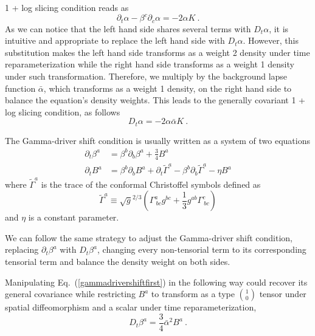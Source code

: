 1 + log slicing condition reads as
\begin{equation}\label{1 + log slicing}
\partial_{t}\alpha - \beta^{c}\partial_{c}\alpha = -2\alpha K \ .
\end{equation}
As we can notice that the left hand side shares several terms with $D_{t}\alpha$, it is intuitive and appropriate to replace the left hand side with $D_{t}\alpha$. However, this substitution makes the left hand side transforms as a weight 2 density under time reparameterization while the right hand side transforms as a weight 1 density under such transformation. Therefore, we multiply by the background lapse function ${\bar \alpha}$, which transforms as a weight 1 density, on the right hand side to balance the equation's density weights. This leads to the generally covariant 1 + log slicing condition, as follows
\begin{equation}\label{covariant 1 + log slicing}
D_{t}\alpha = -2\alpha{\bar \alpha}K \ .
\end{equation}

The Gamma-driver shift condition is usually written as a system of two equations
\begin{subequations}\label{gammadrivershiftset}
\begin{align}
\partial_{t}\beta^{a} & = \beta^{b}\partial_{b}\beta^{a} + \frac{3}{4}B^{a}\label{gammadrivershiftfirst}\\
\partial_{t}B^{a} & = \beta^{b}\partial_{b}B^{a} + \partial_{t}{\tilde \Gamma}^{a} - \beta^{b}\partial_{b}{\tilde \Gamma}^{a} - \eta B^{a}\label{gammadrivershiftsecond}
\end{align}
\end{subequations}
where ${\tilde \Gamma}^{a}$ is the trace of the conformal Christoffel symbols defined as
\begin{equation}
{\tilde \Gamma}^{a} \equiv \sqrt{g}^{2/3}\left(\Gamma^{a}_{~bc}g^{bc} + \frac{1}{3}g^{ab}\Gamma^{c}_{~bc}\right)
\end{equation}
and $\eta$ is a constant parameter. 

We can follow the same strategy to adjust the Gamma-driver shift condition, replacing $\partial_{t}\beta^{a}$ with $D_{t}\beta^{a}$, changing every non-tensorial term to its corresponding tensorial term and balance the density weight on both sides. 

Manipulating Eq.~(\ref{gammadrivershiftfirst}) in the following way could recover its general covariance while restricting $B^{a}$ to transform as a type $1 \choose 0$ tensor under spatial diffeomorphism and a scalar under time reparameterization, 
\begin{equation}\label{gammadrivershiftfirstcovariant}
	D_{t}\beta^{a} = \frac{3}{4}{\bar \alpha}^{2}B^{a} \ .
\end{equation}

